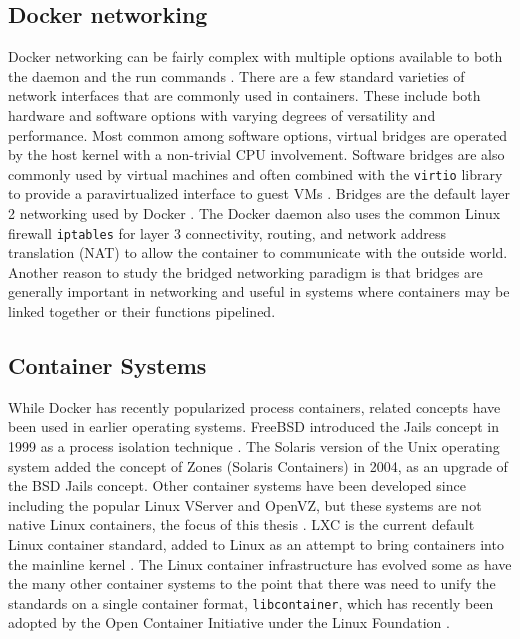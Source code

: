 \subsection{Docker networking} %
\label{sub:dockernetworking}
Docker networking can be fairly complex with multiple options available to both the daemon and the run commands \autocite{dockernetworking1}.
There are a few standard varieties of network interfaces that are commonly used in containers.
These include both hardware and software options with varying degrees of versatility and performance.  
Most common among software options, virtual bridges are operated by the host kernel with a non-trivial CPU involvement. 
Software bridges are also commonly used by virtual machines and often combined with the \texttt{virtio} library to provide a paravirtualized interface to guest VMs \autocite{_virtio_1}. 
Bridges are the default layer 2 networking used by Docker \autocite{dockernetworking1}.  
The Docker daemon also uses the common Linux firewall \texttt{iptables} for layer 3 connectivity, routing, and network address translation (NAT) to allow the container to communicate with the outside world.
Another reason to study the bridged networking paradigm is that bridges are generally important in networking and useful in systems where containers may be linked together or their functions pipelined.

\subsection{Container Systems} %
\label{sec:container_systems}
While Docker has recently popularized process containers, related concepts have been used in earlier operating systems.
FreeBSD introduced the Jails concept in 1999 as a process isolation technique \autocite{_zones_1}.  
The Solaris version of the Unix operating system added the concept of Zones (Solaris Containers) in 2004, as an upgrade of the BSD Jails concept.  
Other container systems have been developed since including the popular Linux VServer and OpenVZ, but these systems are not native Linux containers, the focus of this thesis \autocite{rathore2013kvm, _scheepers_1, des2005virtualization}.  
LXC is the current default Linux container standard, added to Linux as an attempt to bring containers into the mainline kernel \autocite{dockersecurity1}.
The Linux container infrastructure has evolved some as have the many other container systems to the point that there was need to unify the standards on a single container format, \texttt{libcontainer}, which has recently been adopted by the Open Container Initiative under the Linux Foundation \autocite{_oci_1}.  


